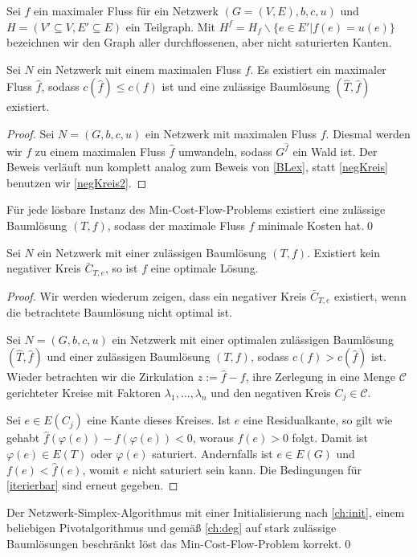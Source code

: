 \begin{nota}Sei $f$ ein maximaler Fluss für ein Netzwerk $(G=(V,E),b,c,u)$ und $H=(V'\subseteq V, E'\subseteq E)$ ein Teilgraph. Mit $H^f=H_f\backslash\{e\in E'|f(e)=u(e)\}$ bezeichnen wir den Graph aller durchflossenen, aber nicht saturierten Kanten.\end{nota}

\begin{thm}\label{BLex2}Sei $N$ ein Netzwerk mit einem maximalen Fluss $f$. Es existiert ein maximaler Fluss $\hat{f}$, sodass $c(\hat{f})\leq c(f)$ ist und eine zulässige Baumlösung $(\hat{T},\hat{f})$ existiert.\end{thm}
\begin{proof}Sei $N=(G,b,c,u)$ ein Netzwerk mit maximalen Fluss $f$. Diesmal werden wir $f$ zu einem maximalen Fluss $\hat{f}$ umwandeln, sodass $G^{\hat{f}}$ ein Wald ist. Der Beweis verläuft nun komplett analog zum Beweis von \cref{BLex}, statt \cref{negKreis} benutzen wir \cref{negKreis2}.\end{proof}

\begin{kor}Für jede lösbare Instanz des Min-Cost-Flow-Problems existiert eine zulässige Baumlösung $(T,f)$, sodass der maximale Fluss $f$ minimale Kosten hat.\qed\end{kor}

\begin{thm}\label{opt2}Sei $N$ ein Netzwerk mit einer zulässigen Baumlösung $(T,f)$. Existiert kein negativer Kreis $\bar{C}_{T,e}$, so ist $f$ eine optimale Lösung.\end{thm}
\begin{proof}Wir werden wiederum zeigen, dass ein negativer Kreis $\bar{C}_{T,e}$ existiert, wenn die betrachtete Baumlösung nicht optimal ist.

Sei $N=(G,b,c,u)$ ein Netzwerk mit einer optimalen zulässigen Baumlösung $(\hat{T},\hat{f})$ und einer zulässigen Baumlösung $(T,f)$, sodass $c(f)>c(\hat{f})$ ist. Wieder betrachten wir die Zirkulation $z:=\hat{f}-f$, ihre Zerlegung in eine Menge $\mathscr{C}$ gerichteter Kreise mit Faktoren $\lambda_1,\ldots,\lambda_n$ und den negativen Kreis $C_j\in\mathscr{C}$.

Sei $e\in E(C_j)$ eine Kante dieses Kreises. Ist $e$ eine Residualkante, so gilt wie gehabt $\hat{f}(\varphi(e))-f(\varphi(e))<0$, woraus $f(e)>0$ folgt. Damit ist $\varphi(e)\in E(T)$ oder $\varphi(e)$ saturiert. Andernfalls ist $e\in E(G)$ und $f(e)<\hat{f}(e)$, womit $e$ nicht saturiert sein kann. Die Bedingungen für \cref{iterierbar} sind erneut gegeben.\end{proof}

\begin{kor}Der Netzwerk-Simplex-Algorithmus mit einer Initialisierung nach \cref{ch:init}, einem beliebigen Pivotalgorithmus und gemäß \cref{ch:deg} auf stark zulässige Baumlösungen beschränkt löst das Min-Cost-Flow-Problem korrekt.\qed\end{kor}